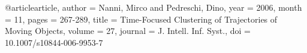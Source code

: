 @article{article,
author = {Nanni, Mirco and Pedreschi, Dino},
year = {2006},
month = {11},
pages = {267-289},
title = {Time-Focused Clustering of Trajectories of Moving Objects},
volume = {27},
journal = {J. Intell. Inf. Syst.},
doi = {10.1007/s10844-006-9953-7}
}